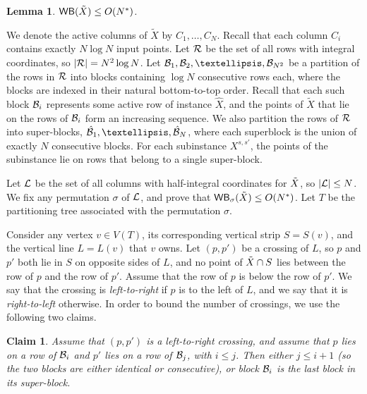 \documentclass[11pt]{article}
\numberwithin{equation}{section}
\newtheorem{lemma}[theorem]{Lemma}
\newtheorem{claim}[theorem]{Claim}
\theoremstyle{definition}
\theoremstyle{plain}
\begin{document}
\begin{lemma}\label{lem: bounding vertical WB for compressed}
	 $\mathsf{WB}(\tilde X)\leq O(N^*)$.
\end{lemma}

We denote the active columns of $\tilde X$ by $C_1,\ldots,C_N$. 
Recall that each column $C_i$ contains exactly $N\log N$ input points. 
Let ${\mathcal R}$ be the set of all rows with integral coordinates, so $|{\mathcal R}|=N^2\log N$. Let $\bset_1,\bset_2,\ldots,\bset_{N^2}$ be a partition of the rows in ${\mathcal R}$ into blocks containing $\log N$ consecutive rows each, where the blocks are indexed in their natural bottom-to-top order. Recall that each such block ${\mathcal{B}}_i$ represents some active row of instance $\hat X$, and the points of $\tilde X$ that lie on the rows of ${\mathcal{B}}_i$ form an increasing sequence. We also partition the rows of ${\mathcal R}$ into super-blocks, $\hat \bset_1,\ldots,\hat \bset_N$, where each superblock is the union of exactly $N$ consecutive blocks. For each subinstance $X^{s,s'}$, the points of the subinstance lie on rows that belong to a single super-block.


Let ${\mathcal L}$ be the set of all columns with half-integral coordinates for $\tilde X$, so $|{\mathcal L}|\leq N$. We fix any permutation $\sigma$ of ${\mathcal L}$, and prove that $\mathsf{WB}_{\sigma}(\tilde X)\leq O(N^*)$. Let $T$ be the partitioning tree associated with the permutation $\sigma$.

Consider any vertex $v\in V(T)$, its corresponding vertical strip $S=S(v)$, and the vertical line $L= L(v)$ that $v$ owns. 
Let $(p,p')$ be a crossing of $L$, so $p$ and $p'$ both lie in $S$ on opposite sides of $L$, and no point of $\tilde X\cap S$ lies between the row of $p$ and the row of $p'$. Assume that the row of $p$ is below the row of $p'$. We say that the crossing is \emph{left-to-right} if $p$ is to the left of $L$, and we say that it is \emph{right-to-left} otherwise. In order to bound the number of crossings, we use the following two claims.

\begin{claim}\label{claim: left to right crossing}
	Assume that $(p,p')$ is a left-to-right crossing, and assume that $p$ lies on a row of ${\mathcal{B}}_i$ and $p'$ lies on a row of ${\mathcal{B}}_j$, with $i\leq j$. Then either $j\leq i+1$ (so the two blocks are either identical or consecutive), or block ${\mathcal{B}}_i$ is the last block in its super-block.
\end{claim}
\end{document}
